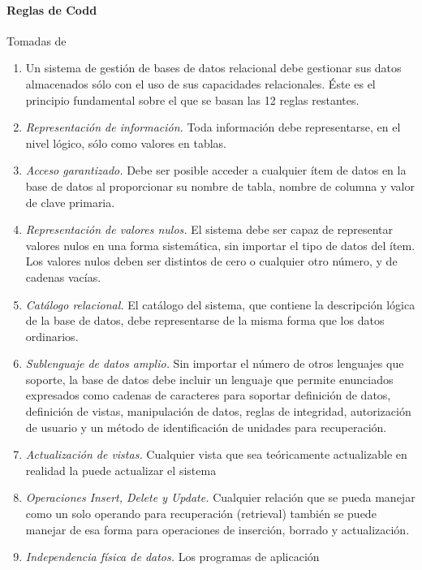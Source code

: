\documentclass[12pt]{report}
\begin{document}
			\paragraph{Reglas de Codd} Tomadas de 
			\begin{enumerate}[label=\textbf{Regla \arabic*.},start=0]
				\item Un sistema de gestión de bases de datos relacional debe 
					gestionar sus datos almacenados sólo con el uso de sus capacidades
					relacionales. Éste es el principio fundamental sobre el que se 
					basan las 12 reglas restantes.
				\item \textit{Representación de información.} Toda información debe 
					representarse, en el nivel lógico, sólo como valores en tablas.
				\item \textit{Acceso garantizado.} Debe ser posible acceder a 
					cualquier ítem de datos en la base de datos al proporcionar su 
					nombre de tabla, nombre de columna y valor de clave primaria.
				\item \textit{Representación de valores nulos.} El sistema debe 
					ser capaz de representar valores nulos en una forma sistemática, 
					sin importar el tipo de datos del ítem. Los valores nulos deben 
					ser distintos de cero o cualquier otro número, y de cadenas vacías.
				\item \textit{Catálogo relacional.} El catálogo del sistema, que 
					contiene la descripción lógica de la base de datos, debe 
					representarse de la misma forma que los datos ordinarios.
				\item \textit{Sublenguaje de datos amplio.} Sin importar el número 
					de otros lenguajes que soporte, la base de datos debe incluir un 
					lenguaje que permite enunciados expresados como cadenas de 
					caracteres para soportar definición de datos, definición de vistas, 
					manipulación de datos, reglas de integridad, autorización de usuario 
					y un método de identificación de unidades para recuperación.
				\item \textit{Actualización de vistas.} Cualquier vista que sea 
					teóricamente actualizable en realidad la puede actualizar el sistema
				\item \textit{Operaciones Insert, Delete y Update.} Cualquier relación
					que se pueda manejar como un solo operando para recuperación 
					(retrieval) también se puede manejar de esa forma para operaciones 
					de inserción, borrado y actualización.
				\item \textit{Independencia física de datos.} Los programas de aplicación 

\end{enumerate}
\end{document}
